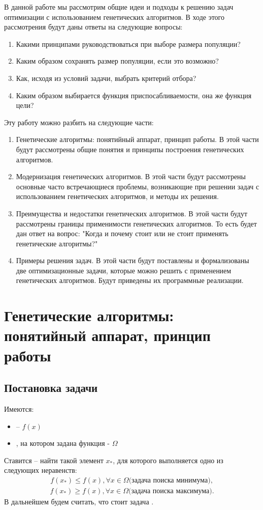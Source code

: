 В данной работе мы рассмотрим общие идеи и подходы к решению задач оптимизации с использованием генетических алгоритмов. В ходе этого рассмотрения будут даны ответы на следующие вопросы:
\begin{enumerate}
\item Какими принципами руководствоваться при выборе размера популяции?
\item Каким образом сохранять размер популяции, если это возможно?
\item Как, исходя из условий задачи, выбрать критерий отбора?
\item Каким образом выбирается функция приспосабливаемости, она же функция цели?
\end{enumerate}
Эту работу можно разбить на следующие части:
\begin{enumerate}
\item Генетические алгоритмы: понятийный аппарат, принцип работы. В этой части будут рассмотрены общие понятия и принципы построения генетических алгоритмов.
\item Модернизация генетических алгоритмов. В этой части будут рассмотрены основные часто встречающиеся проблемы, возникающие при решении задач с использованием генетических алгоритмов, и методы их решения.
\item Преимущества и недостатки генетических алгоритмов. В этой части будут рассмотрены границы применимости генетических алгоритмов. То есть будет дан ответ на вопрос: "Когда и почему стоит или не стоит применять генетические алгоритмы?"
\item Примеры решения задач. В этой части будут поставлены и формализованы две оптимизационные задачи, которые можно решить с применением генетических алгоритмов. Будут приведены их программные реализации.
\end{enumerate}
\chapter{Генетические алгоритмы: понятийный аппарат, принцип работы}
\section{Постановка задачи}
Имеются:
\begin{itemize}
\item {} --  $f(x)$
\item {}, на котором задана функция - $\Omega$
\end{itemize}
Ставится  -- найти такой элемент $x_{\ast}$, для которого выполняется одно из следующих неравенств:
\begin{eqnarray*}
f(x_{\ast}) \leq f(x), \forall x \in \Omega  \textrm{(задача поиска минимума)},
\end{eqnarray*}
\begin{eqnarray*}
f(x_{\ast}) \geq f(x), \forall x \in \Omega  \textrm{(задача поиска максимума)}.
\end{eqnarray*}
В дальнейшем будем считать, что стоит задача .

